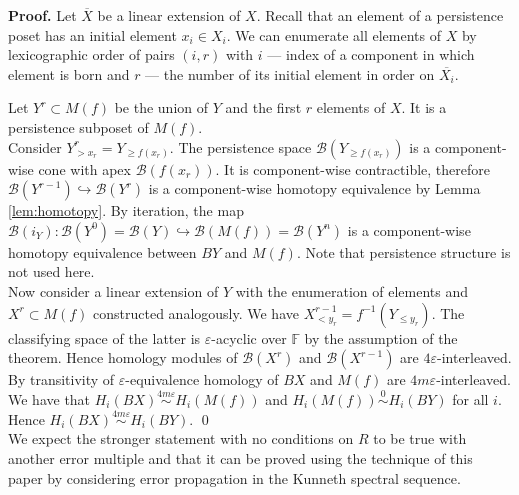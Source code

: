 \documentclass[english,12pt]{article}
\numberwithin{equation}{section}
\theoremstyle{definition}
\theoremstyle{remark}
\newenvironment{pf}{\noindent\textbf{Proof.}}{\qed}
\renewcommand{\geq}{\geqslant}
\begin{document}
\begin{pf}
  Let $\overline{X}$ be a linear extension of $X$. Recall that an element of a persistence poset has an initial element $x_i \in X_i$. We can enumerate all elements of $X$ by lexicographic order of pairs $(i,r)$ with $i$ --- index of a component in which element is born and $r$ --- the number of its initial element in order on $\overline{X_i}$.

  Let $Y^r \subset M(f)$ be the union of $Y$ and the first $r$ elements of $X$. It is a persistence subposet of $M(f)$.\\

  Consider $Y^r_{>x_r} = Y_{\geq f(x_r)}$. The persistence space $\mathcal{B}(Y_{\geq f(x_r)})$ is a component-wise cone with apex $\mathcal{B}(f(x_r))$. It is component-wise contractible, therefore $\mathcal{B}(Y^{r-1}) \hookrightarrow \mathcal{B}(Y^{r})$ is a component-wise homotopy equivalence by Lemma \ref{lem:homotopy}. By iteration, the map $\mathcal{B}(i_Y) : \mathcal{B}(Y^{0}) = \mathcal{B}(Y) \hookrightarrow \mathcal{B}(M(f)) = \mathcal{B}(Y^n)$ is a component-wise homotopy equivalence between $BY$ and $M(f)$. Note that persistence structure is not used here.\\

  Now consider a linear extension of $Y$ with the enumeration of elements and $X^r \subset M(f)$ constructed analogously. We have $X^{r-1}_{< y_r} = f^{-1}(Y_{\leqslant y_r})$. The classifying space of the latter is $\varepsilon$-acyclic over $\mathbb{F}$ by the assumption of the theorem. Hence homology modules of $\mathcal{B}(X^{r})$ and $\mathcal{B}(X^{r-1})$ are $4\varepsilon$-interleaved. By transitivity of $\varepsilon$-equivalence homology of $BX$ and $M(f)$ are $4m\varepsilon$-interleaved.\\

  We have that $H_i(BX) \stackrel{4m\varepsilon}{\sim} H_i(M(f))$ and $H_i(M(f)) \stackrel{0}{\sim} H_i(BY)$ for all $i$. Hence $H_i(BX) \stackrel{4m\varepsilon}{\sim} H_i(BY)$.
\end{pf}\\

We expect the stronger statement with no conditions on $R$ to be true with another error multiple and that it can be proved using the technique of this paper by considering error propagation in the Kunneth spectral sequence.
\end{document}
